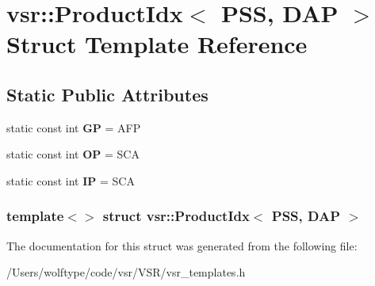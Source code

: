 \hypertarget{structvsr_1_1_product_idx_3_01_p_s_s_00_01_d_a_p_01_4}{\section{vsr\-:\-:Product\-Idx$<$ P\-S\-S, D\-A\-P $>$ Struct Template Reference}
\label{structvsr_1_1_product_idx_3_01_p_s_s_00_01_d_a_p_01_4}
}
\subsection*{Static Public Attributes}
\begin{DoxyCompactItemize}
\item 
\hypertarget{structvsr_1_1_product_idx_3_01_p_s_s_00_01_d_a_p_01_4_accbd37c566e36c544a7d6c20e3026811}{static const int {\bfseries G\-P} = A\-F\-P}\label{structvsr_1_1_product_idx_3_01_p_s_s_00_01_d_a_p_01_4_accbd37c566e36c544a7d6c20e3026811}

\item 
\hypertarget{structvsr_1_1_product_idx_3_01_p_s_s_00_01_d_a_p_01_4_a501290fe82cbf7a5763dc4c4d45f6247}{static const int {\bfseries O\-P} = S\-C\-A}\label{structvsr_1_1_product_idx_3_01_p_s_s_00_01_d_a_p_01_4_a501290fe82cbf7a5763dc4c4d45f6247}

\item 
\hypertarget{structvsr_1_1_product_idx_3_01_p_s_s_00_01_d_a_p_01_4_aaeecc7c8cb773ea8a3ee53189da403ac}{static const int {\bfseries I\-P} = S\-C\-A}\label{structvsr_1_1_product_idx_3_01_p_s_s_00_01_d_a_p_01_4_aaeecc7c8cb773ea8a3ee53189da403ac}

\end{DoxyCompactItemize}
\subsubsection*{template$<$$>$ struct vsr\-::\-Product\-Idx$<$ P\-S\-S, D\-A\-P $>$}



The documentation for this struct was generated from the following file\-:\begin{DoxyCompactItemize}
\item 
/\-Users/wolftype/code/vsr/\-V\-S\-R/vsr\-\_\-templates.\-h\end{DoxyCompactItemize}
